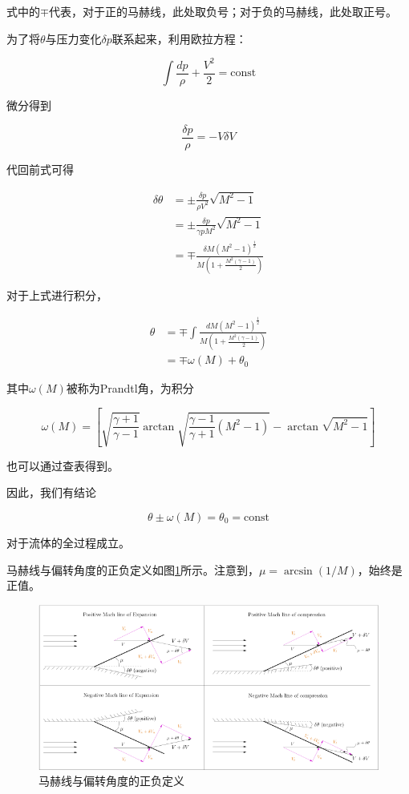 式中的$\mp$代表，对于正的马赫线，此处取负号；对于负的马赫线，此处取正号。

为了将$\theta$与压力变化$\delta p$联系起来，利用欧拉方程：

\begin{equation*}
    \int \frac{d p}{\rho}+\frac{V^{2}}{2}=\mathrm{const}
\end{equation*}

微分得到

\begin{equation*}
    \frac{\delta p}{\rho}=-V \delta V
\end{equation*}

代回前式可得

\begin{align*}
    \delta \theta&=\pm \frac{\delta p}{\rho V^{2}} \sqrt{M^{2}-1}\\ 
    &=\pm \frac{\delta p}{\gamma p M^{2}} \sqrt{M^{2}-1}\\ 
    &=\mp \frac{\delta M\left(M^{2}-1\right)^{\frac{1}{2}}}{M\left(1+\frac{M^{2}(\gamma-1)}{2}\right)}
\end{align*}

对于上式进行积分，

\begin{align*}
    \theta&=\mp \int \frac{d M\left(M^{2}-1\right)^{\frac{1}{2}}}{M\left(1+\frac{M^{2}(\gamma-1)}{2}\right)}\\ 
    &=\mp \omega(M)+\theta_{0}
\end{align*}

其中$\omega(M)$被称为Prandtl角，为积分

\begin{equation*}
    \omega(M)=[\sqrt{\frac{\gamma+1}{\gamma-1}} \arctan \sqrt{\frac{\gamma-1}{\gamma+1}\left(M^{2}-1\right)}-\arctan \sqrt{M^{2}-1}]
\end{equation*}

也可以通过查表得到。

因此，我们有结论

\begin{equation*}
    \theta\pm\omega(M)=\theta_0=\mathrm{const}
\end{equation*}

对于流体的全过程成立。

马赫线与偏转角度的正负定义如图\ref{15}所示。注意到，$\mu=\arcsin(1/M)$，始终是正值。

\begin{figure}[!ht]
    \centering
    \includegraphics[width=\linewidth]{figures/15.png}
    \caption{马赫线与偏转角度的正负定义}
    \label{15}
\end{figure}

